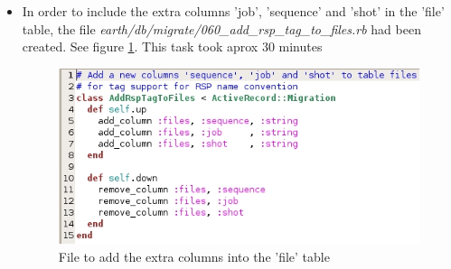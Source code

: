 \documentclass[a4paper,10pt]{article}
\begin{document}
\begin{itemize}
 \item In order to include the extra columns 'job', 'sequence' and 'shot' in the 'file' table, the file \textit{earth/db/migrate/060\_add\_rsp\_tag\_to\_files.rb} had been created.  See figure \ref{fig:columns}.  This task took aprox 30 minutes
\begin{figure}[h]
 \centering
 \includegraphics[scale=0.5]{images/060AddRspTagToFiles.jpg}
 \caption{File to add the extra columns into the 'file' table}
 \label{fig:columns}
\end{figure}


\end{itemize}
\end{document}
